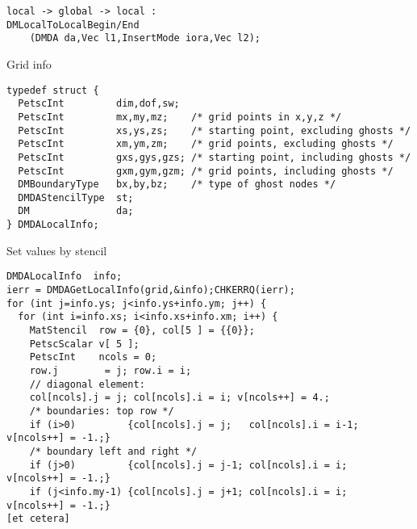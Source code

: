 \begin{longversion}
{\begin{verbatim}
local -> global -> local :
DMLocalToLocalBegin/End
    (DMDA da,Vec l1,InsertMode iora,Vec l2);
\end{verbatim}
}




\begin{frame}[containsverbatim]{Grid info}
\begin{verbatim}
typedef struct {
  PetscInt         dim,dof,sw;
  PetscInt         mx,my,mz;    /* grid points in x,y,z */
  PetscInt         xs,ys,zs;    /* starting point, excluding ghosts */
  PetscInt         xm,ym,zm;    /* grid points, excluding ghosts */
  PetscInt         gxs,gys,gzs; /* starting point, including ghosts */
  PetscInt         gxm,gym,gzm; /* grid points, including ghosts */
  DMBoundaryType   bx,by,bz;    /* type of ghost nodes */
  DMDAStencilType  st;
  DM               da;
} DMDALocalInfo;
\end{verbatim}
\end{frame}

\begin{frame}[containsverbatim]{Set values by stencil}
\begin{lstlisting}
DMDALocalInfo  info;
ierr = DMDAGetLocalInfo(grid,&info);CHKERRQ(ierr);
for (int j=info.ys; j<info.ys+info.ym; j++) {
  for (int i=info.xs; i<info.xs+info.xm; i++) {
    MatStencil  row = {0}, col[5 ] = {{0}};
    PetscScalar v[ 5 ];
    PetscInt    ncols = 0;
    row.j        = j; row.i = i;
    // diagonal element:
    col[ncols].j = j; col[ncols].i = i; v[ncols++] = 4.;
    /* boundaries: top row */
    if (i>0)         {col[ncols].j = j;   col[ncols].i = i-1; v[ncols++] = -1.;}
    /* boundary left and right */
    if (j>0)         {col[ncols].j = j-1; col[ncols].i = i;   v[ncols++] = -1.;}
    if (j<info.my-1) {col[ncols].j = j+1; col[ncols].i = i;   v[ncols++] = -1.;}
[et cetera]    
\end{lstlisting}
\end{frame}


\end{longversion}
